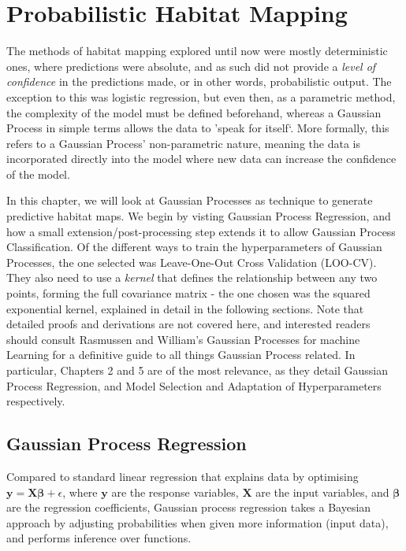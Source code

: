 \chapter{Probabilistic Habitat Mapping} \label{chap:gps}

The methods of habitat mapping explored until now were mostly deterministic ones, where predictions were absolute, and as such did not provide a \textit{level of confidence} in the predictions made, or in other words, probabilistic output. The exception to this was logistic regression, but even then, as a parametric method, the complexity of the model must be defined beforehand, whereas a Gaussian Process in simple terms allows the data to 'speak for itself`. More formally, this refers to a Gaussian Process' non-parametric nature, meaning the data is incorporated directly into the model where new data can increase the confidence of the model.

In this chapter, we will look at Gaussian Processes as technique to generate predictive habitat maps. We begin by visting Gaussian Process Regression, and how a small extension/post-processing step extends it to allow Gaussian Process Classification. Of the different ways to train the hyperparameters of Gaussian Processes, the one selected was Leave-One-Out Cross Validation (LOO-CV). They also need to use a \textit{kernel} that defines the relationship between any two points, forming the full covariance matrix - the one chosen was the squared exponential kernel, explained in detail in the following sections. Note that detailed proofs and derivations are not covered here, and interested readers should consult Rasmussen and William's Gaussian Processes for machine Learning \cite{rasmussen06} for a definitive guide to all things Gaussian Process related. In particular, Chapters 2 and 5 are of the most relevance, as they detail Gaussian Process Regression, and Model Selection and Adaptation of Hyperparameters respectively.


\section{Gaussian Process Regression}\label{chapsec:gpr}

Compared to standard linear regression that explains data by optimising $\mathbf{y=X\beta} + \epsilon$, where $\mathbf{y}$ are the response variables, $\mathbf{X}$ are the input variables, and $\mathbf{\beta}$ are the regression coefficients, Gaussian process regression takes a Bayesian approach by adjusting probabilities when given more information (input data), and performs inference over functions.


